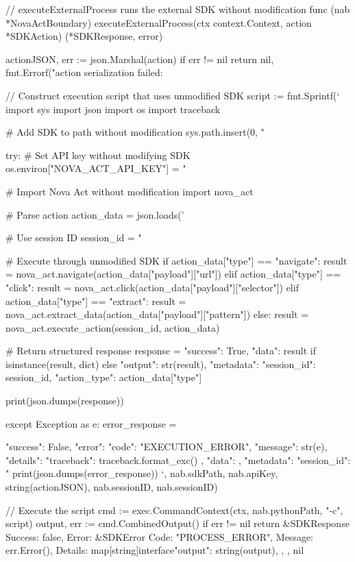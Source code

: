 // executeExternalProcess runs the external SDK without modification
func (nab *NovaActBoundary) executeExternalProcess(ctx context.Context, action *SDKAction) (*SDKResponse, error) {
    actionJSON, err := json.Marshal(action)
    if err != nil {
        return nil, fmt.Errorf("action serialization failed: %
    }

    // Construct execution script that uses unmodified SDK
    script := fmt.Sprintf(`
import sys
import json
import os
import traceback

# Add SDK to path without modification
sys.path.insert(0, "%

try:
    # Set API key without modifying SDK
    os.environ["NOVA_ACT_API_KEY"] = "%

    # Import Nova Act without modification
    import nova_act

    # Parse action
    action_data = json.loads('%

    # Use session ID
    session_id = "%

    # Execute through unmodified SDK
    if action_data["type"] == "navigate":
        result = nova_act.navigate(action_data["payload"]["url"])
    elif action_data["type"] == "click":
        result = nova_act.click(action_data["payload"]["selector"])
    elif action_data["type"] == "extract":
        result = nova_act.extract_data(action_data["payload"]["pattern"])
    else:
        result = nova_act.execute_action(session_id, action_data)

    # Return structured response
    response = {
        "success": True,
        "data": result if isinstance(result, dict) else {"output": str(result)},
        "metadata": {
            "session_id": session_id,
            "action_type": action_data["type"]
        }
    }

    print(json.dumps(response))

except Exception as e:
    error_response = {
        "success": False,
        "error": {
            "code": "EXECUTION_ERROR",
            "message": str(e),
            "details": {"traceback": traceback.format_exc()}
        },
        "data": {},
        "metadata": {"session_id": "%
    }
    print(json.dumps(error_response))
`, nab.sdkPath, nab.apiKey, string(actionJSON), nab.sessionID, nab.sessionID)

    // Execute the script
    cmd := exec.CommandContext(ctx, nab.pythonPath, "-c", script)
    output, err := cmd.CombinedOutput()
    if err != nil {
        return &SDKResponse{
            Success: false,
            Error: &SDKError{
                Code:    "PROCESS_ERROR",
                Message: err.Error(),
                Details: map[string]interface{}{"output": string(output)},
            },
        }, nil
    }

}}
